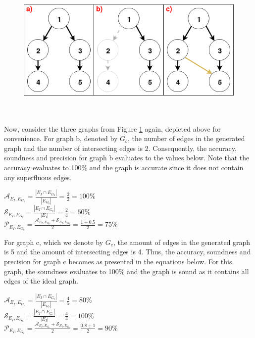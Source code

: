 \documentclass{kththesis}
\begin{document}
\begin{figure}[ht]
    \centering
    \includegraphics[scale=0.6]{Images/SoundAccurateGraph.png}
    \label{fig:SoundAccurateGraph}
\end{figure}
\\ \\
Now, consider the three graphs from Figure \ref{fig:SoundAccurateGraph} again, depicted above for convenience. For graph b, denoted by $G_b$, the number of edges in the generated graph and the number of intersecting edges is 2. Consequently, the accuracy, soundness and precision for graph b evaluates to the values below. Note that the accuracy evaluates to 100\% and the graph is accurate since it does not contain any superfluous edges. 
\begin{center}
$\mathcal{A}_{E_I,E_{G_b}} = \frac{|E_I \cap E_{G_b}|}{|E_{G_b}|}=\frac{2}{2}=100\%$\\ $\mathcal{S}_{E_I,E_{G_b}} = \frac{|E_I \cap E_{G_b}|}{|E_I|}=\frac{2}{4}=50\%$\\
$ \mathcal{P}_{E_I,E_{G_b}} = \frac{\mathcal{A}_{E_I,E_{G_b}}+\mathcal{S}_{E_I,E_{G_b}}}{2}=\frac{1+0.5}{2}=75\%$\\
\end{center}
For graph c, which we denote by $G_c$, the amount of edges in the generated graph is 5 and the amount of intersecting edges is 4. Thus, the accuracy, soundness and precision for graph c becomes as presented in the equations below. For this graph, the soundness evaluates to 100\% and the graph is sound as it contains all edges of the ideal graph. 
\begin{center}
$\mathcal{A}_{E_I,E_{G_c}} = \frac{|E_I \cap E_{G_c}|}{|E_{G_c}|}=\frac{4}{5}=80\%$\\ $\mathcal{S}_{E_I,E_{G_c}} = \frac{|E_I \cap E_{G_c}|}{|E_I|}=\frac{4}{4}=100\%$\\
$ \mathcal{P}_{E_I,E_{G_c}} = \frac{\mathcal{A}_{E_I,E_{G_c}}+\mathcal{S}_{E_I,E_{G_c}}}{2}=\frac{0.8+1}{2}=90\%$\\
\end{center}
\end{document}
